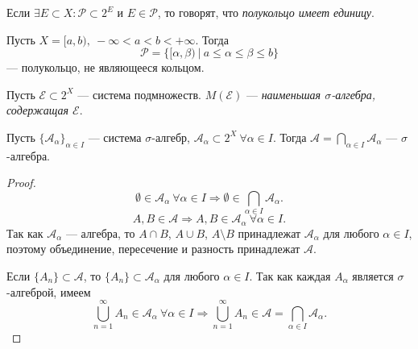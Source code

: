 \begin{remark}
    Если $\exists E \subset X: \mathcal{P} \subset 2^E$ и $E \in \mathcal{P}$, то говорят, что \textit{полукольцо имеет единицу}.
\end{remark}

\begin{example}
    Пусть $X = [a,b), \ -\infty < a < b < +\infty$.
    Тогда $$\mathcal{P} = \{[\alpha,\beta) \ | \ a \leqslant \alpha \leqslant \beta \leqslant b\}$$
    — полукольцо, не являющееся кольцом.
\end{example}

\begin{definition}
    Пусть $\mathcal{E} \subset 2^X$ — система подмножеств. $M(\mathcal{E})$ — \textit{наименьшая $\sigma$-алгебра, содержащая $\mathcal{E}$}.
\end{definition} 

\begin{lemma}
    Пусть $\{\mathcal{A}_\alpha\}_{\alpha \in I}$ — система $\sigma$-алгебр, $\mathcal{A}_\alpha \subset 2^X \ \forall \alpha \in I$. Тогда $\mathcal{A} = \bigcap\limits_{\alpha \in I} \mathcal{A}_\alpha$ — $\sigma$-алгебра.
\end{lemma} 
\begin{proof}
    $$\emptyset \in \mathcal{A}_\alpha \ \forall \alpha \in I \Longrightarrow \emptyset \in \bigcap\limits_{\alpha \in I} \mathcal{A}_\alpha.$$
    $$A, B \in \mathcal{A} \Longrightarrow A, B \in \mathcal{A}_\alpha \ \forall \alpha \in I.$$
    Так как $\mathcal{A}_\alpha$ — алгебра, то $A \cap B$, $A \cup B$, $A \setminus B$ принадлежат $\mathcal{A}_\alpha$ для любого $\alpha \in I$, поэтому объединение, пересечение и разность принадлежат $\mathcal{A}$.

    Если $\{A_n\} \subset \mathcal{A}$, то $\{A_n\} \subset \mathcal{A}_\alpha$ для любого $\alpha \in I$. Так как каждая $A_\alpha$ является $\sigma$-алгеброй, имеем
    \[\bigcup\limits_{n=1}^{\infty} A_n \in \mathcal{A}_\alpha \ \forall \alpha \in I \Longrightarrow \bigcup\limits_{n=1}^{\infty} A_n \in \mathcal{A} = \bigcap\limits_{\alpha \in I} \mathcal{A}_\alpha.\]
\end{proof} 

